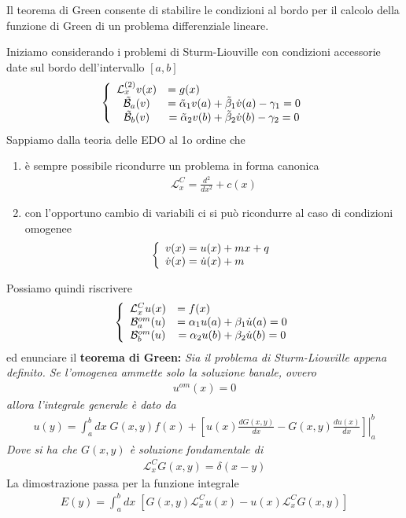 Il teorema di Green consente di stabilire le condizioni al bordo per il calcolo della funzione di Green di un problema differenziale lineare.

Iniziamo considerando i problemi di Sturm-Liouville con condizioni accessorie date sul bordo dell'intervallo $[a,b]$
\begin{align}
	\triple{\mathcal{L}_x^{(2)} v(x) &= g(x) \hfill}{\mathcal{\tilde{B}}_a(v) &= \tilde{\alpha}_1 v(a) + \tilde{\beta}_1 \dot{v}(a) - \gamma_1 = 0}{\mathcal{\tilde{B}}_b(v) &= \tilde{\alpha}_2 v(b) + \tilde{\beta}_2 \dot{v}(b) - \gamma_2 = 0}
\end{align}
Sappiamo dalla teoria delle EDO al 1o ordine che 
\begin{enumerate}
	\item è sempre possibile ricondurre un problema in forma canonica
	\begin{align}
		\mathcal{L}_x^{C} = \frac{d^2}{dx^2} + c(x) \label{omcond3}
	\end{align} 
	\item con l'opportuno cambio di variabili ci si può ricondurre al caso di condizioni omogenee
	\begin{align}
		\double{v(x) = u(x)+ mx + q}{\dot{v}(x) = \dot{u}(x) +m \hfill}			
	\end{align}
\end{enumerate}
Possiamo quindi riscrivere
\begin{align}
	\triple{\mathcal{L}_x^{C} u(x) &= f(x) \hfill}{\mathcal{B}^{om}_a(u) &= \alpha_1 u(a) + \beta_1 \dot{u}(a) = 0}{\mathcal{B}^{om}_b(u) &= \alpha_2 u(b) + \beta_2 \dot{u}(b) = 0} \label{omcond1}
\end{align}
ed enunciare il \textbf{teorema di Green:} \textit{Sia il problema di Sturm-Liouville appena definito. Se l'omogenea ammette solo la soluzione banale, ovvero
	\begin{align}
		u^{om}(x) = 0
	\end{align}
	allora l'integrale generale è dato da
	\begin{align}
		u(y) = \int_{a}^{b} dx \; G(x,y) f(x) + \left.\left[ u(x) \frac{dG(x,y)}{dx} - G(x,y) \frac{du(x)}{dx} \right]\right|_a^b
	\end{align}
	Dove si ha che $G(x,y)$ è soluzione fondamentale di
	\begin{align}
		\mathcal{L}_x^{C} G(x,y) = \delta(x-y) \label{omcond2}
	\end{align}
}
La dimostrazione passa per la funzione integrale
\begin{align}
	E(y) = \int_{a}^{b} dx \; [G(x,y) \mathcal{L}_x^{C} u(x) - u(x)  \mathcal{L}_x^{C} G(x,y)]
\end{align}

